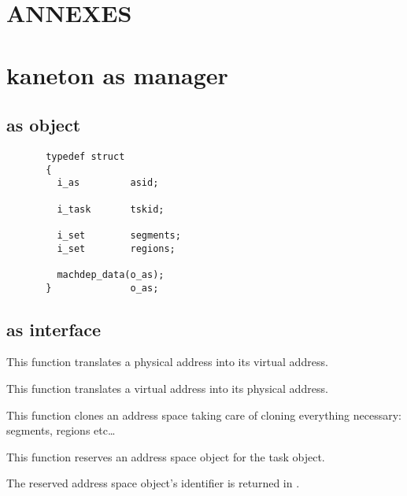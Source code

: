 \section*{ANNEXES}

\section*{kaneton as manager}

\subsection*{as object}

\begin{verbatim}
       typedef struct
       {
         i_as         asid;

         i_task       tskid;

         i_set        segments;
         i_set        regions;

         machdep_data(o_as);
       }              o_as;
\end{verbatim}

\subsection*{as interface}

	 {
	   This function translates a physical address into its virtual
	   address.
	 }

	 {
	   This function translates a virtual address into its physical
	   address.
	 }

	 {
	   This function clones an address space taking care of cloning
	   everything necessary: segments, regions etc\ldots
	 }

	 {
	   This function reserves an address space object for the
	   task  object.

	   The reserved address space object's identifier is returned
	   in .
	 }

